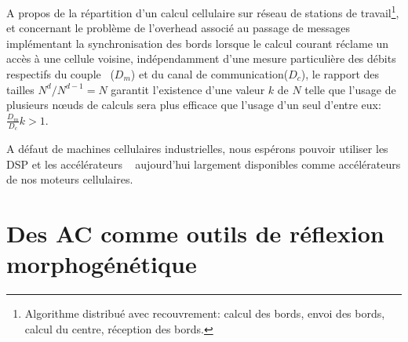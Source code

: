 A propos de la répartition d'un calcul cellulaire sur réseau de
stations de travail\footnote{%
  Algorithme distribué avec recouvrement: calcul des bords, envoi des
  bords, calcul du centre, réception des bords.}, %
et concernant le problème de l'overhead associé au passage de messages
implémentant la synchronisation des bords lorsque le calcul courant
réclame un accès à une cellule voisine, indépendamment d'une mesure
particulière des débits respectifs du couple
~($D_{m}$) et du canal de communication($D_{c}$),
le rapport des tailles  $N^{d}/N^{d-1} = N$
garantit l'existence d'une valeur $k$ de $N$ telle que l'usage de
plusieurs nœuds de calculs sera plus efficace que l'usage d'un
seul d'entre eux:~$\frac{D_{m}}{D_{c}} k > 1$. %

A défaut de machines cellulaires industrielles, nous
espérons pouvoir utiliser les DSP et les accélérateurs
~\cite[]{Pike84} aujourd'hui largement disponibles
comme accélérateurs de nos moteurs cellulaires. %

\section[AC et morphogénèse]{Des AC comme outils de réflexion morphogénétique}

